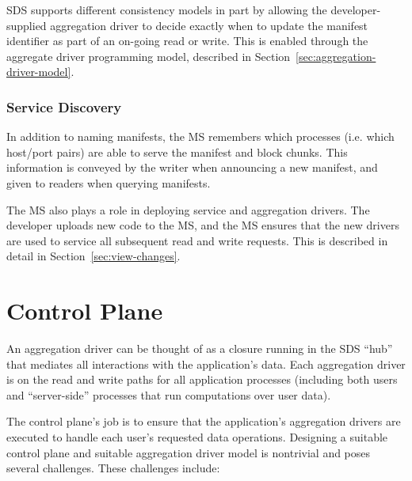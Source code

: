 SDS supports different consistency models in part by allowing the
developer-supplied aggregation driver to decide exactly when to update
the manifest identifier as part of an on-going read or write.
This is enabled through the aggregate driver programming model,
described in Section~\ref{sec:aggregation-driver-model}.

\subsubsection{Service Discovery}

In addition to naming manifests, the MS remembers which processes
(i.e. which host/port pairs) are able to serve the manifest and block chunks.
This information is conveyed by the writer when announcing a new manifest,
and given to readers when querying manifests.

The MS also plays a role in deploying service and aggregation drivers.  The
developer uploads new code to the MS, and the MS ensures that the new drivers
are used to service all subsequent read and write requests.  This is described
in detail in Section~\ref{sec:view-changes}.

\section{Control Plane}

An aggregation driver can be thought of as a closure running in the SDS ``hub''
that mediates all interactions with the application's data.  Each aggregation
driver is on the read and write paths for all application processes (including
both users and ``server-side'' processes that run computations over user data).

The control plane's job is to ensure that the application's aggregation
drivers are executed to handle each user's requested data operations.
Designing a suitable control plane and suitable aggregation driver
model is nontrivial and poses several challenges.  These challenges include:

